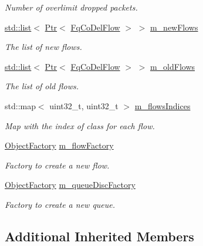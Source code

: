 \begin{DoxyCompactItemize}
\begin{DoxyCompactList}\small\item\em Number of overlimit dropped packets. \end{DoxyCompactList}\item 
\hyperlink{openflow-interface_8h_afd9bcfa176617760671b67580f536fa7}{std\+::list}$<$ \hyperlink{classns3_1_1Ptr}{Ptr}$<$ \hyperlink{classns3_1_1FqCoDelFlow}{Fq\+Co\+Del\+Flow} $>$ $>$ \hyperlink{classns3_1_1FqCoDelQueueDisc_ae0d12b788b8519457393fa0b37714947}{m\+\_\+new\+Flows}
\begin{DoxyCompactList}\small\item\em The list of new flows. \end{DoxyCompactList}\item 
\hyperlink{openflow-interface_8h_afd9bcfa176617760671b67580f536fa7}{std\+::list}$<$ \hyperlink{classns3_1_1Ptr}{Ptr}$<$ \hyperlink{classns3_1_1FqCoDelFlow}{Fq\+Co\+Del\+Flow} $>$ $>$ \hyperlink{classns3_1_1FqCoDelQueueDisc_a025a35ed71b066c207dcc74afae8f215}{m\+\_\+old\+Flows}
\begin{DoxyCompactList}\small\item\em The list of old flows. \end{DoxyCompactList}\item 
std\+::map$<$ uint32\+\_\+t, uint32\+\_\+t $>$ \hyperlink{classns3_1_1FqCoDelQueueDisc_a7ddb7f3d7e4f79c6e1c0cf3803423054}{m\+\_\+flows\+Indices}
\begin{DoxyCompactList}\small\item\em Map with the index of class for each flow. \end{DoxyCompactList}\item 
\hyperlink{classns3_1_1ObjectFactory}{Object\+Factory} \hyperlink{classns3_1_1FqCoDelQueueDisc_a36344316002e616efd119c6a6985bfaa}{m\+\_\+flow\+Factory}
\begin{DoxyCompactList}\small\item\em Factory to create a new flow. \end{DoxyCompactList}\item 
\hyperlink{classns3_1_1ObjectFactory}{Object\+Factory} \hyperlink{classns3_1_1FqCoDelQueueDisc_a231b9b21c4ff12cdf57d2d386d1c5328}{m\+\_\+queue\+Disc\+Factory}
\begin{DoxyCompactList}\small\item\em Factory to create a new queue. \end{DoxyCompactList}\end{DoxyCompactItemize}
\subsection*{Additional Inherited Members}


